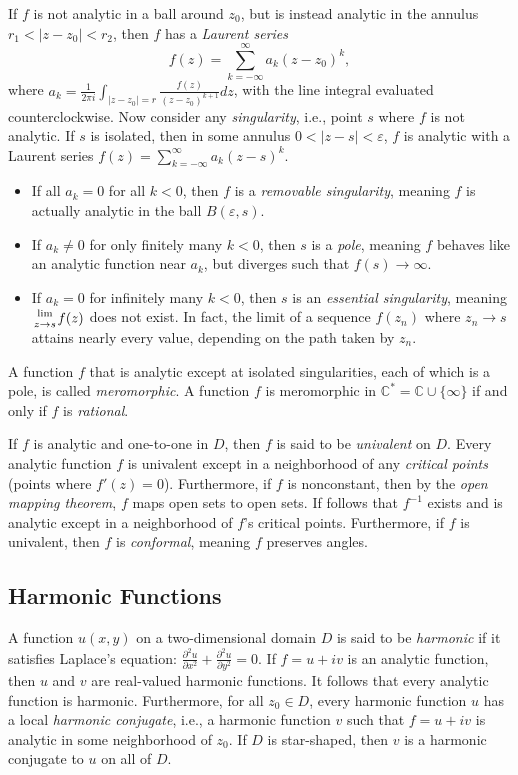 \documentclass[12pt]{article}
\begin{document}
If $f$ is not analytic in a ball around $z_0$, but is instead analytic
in the annulus $r_1 < |z - z_0| < r_2$, then $f$ has a {\it Laurent series}
$$f(z)=\sum_{k=-\infty}^{\infty} a_k (z-z_0)^k,$$
where $a_k = \frac{1}{2\pi i}\int_{|z-z_0|=r}\frac{f(z)}{(z-z_0)^{k+1}} dz$,
with the line integral evaluated counterclockwise.
Now consider any {\it singularity}, i.e., point $s$ where $f$ is not
analytic. If $s$ is isolated, then in some annulus $0<|z-s|<\varepsilon$,
$f$ is analytic with a Laurent series 
$f(z)=\sum_{k=-\infty}^\infty a_k(z-s)^k$.
\begin{itemize}
	\item If all $a_k = 0$ for all $k < 0$, then $f$ is a
		{\it removable singularity}, meaning $f$ is actually
		analytic in the ball $B(\varepsilon,s)$.
	\item If $a_k \neq 0$ for only finitely many $k < 0$, then $s$
		is a {\it pole}, meaning $f$ behaves like an analytic
		function near $a_k$, but diverges such that
		$f(s)\rightarrow\infty$.
	\item If $a_k = 0$ for infinitely many $k < 0$, then $s$ is an
		{\it essential singularity}, meaning
		${\lim \atop z\rightarrow s}f(z)$ does not exist. In fact,
		the limit of a sequence $f(z_n)$ where $z_n\rightarrow s$
		attains nearly every value, depending on the path
		taken by $z_n$.
\end{itemize}
A function $f$ that is analytic except at isolated singularities, each of
which is a pole, is called {\it meromorphic}. A function $f$ is
meromorphic in $\mathbb{C}^* = \mathbb{C}\cup\{\infty\}$ if and only if
$f$ is {\it rational}.

If $f$ is analytic and one-to-one in $D$, then $f$ is said to be
{\it univalent} on $D$. Every analytic function $f$ is univalent except
in a neighborhood of any {\it critical points}
(points where $f'(z) = 0$). Furthermore, if $f$ is nonconstant,
then by the {\it open mapping theorem}, $f$ maps open sets to open
sets. If follows that $f^{-1}$ exists and is analytic except in a
neighborhood of $f$'s critical points. Furthermore, if $f$ is
univalent, then $f$ is {\it conformal}, meaning $f$ preserves angles.

\subsection*{Harmonic Functions}

A function $u(x,y)$ on a two-dimensional domain $D$ is said to be
{\it harmonic} if it satisfies Laplace's equation:
$\frac{\partial^2 u}{\partial x^2} + \frac{\partial^2 u}{\partial y^2} = 0$.
If $f = u + iv$ is an analytic function, then $u$ and $v$ are real-valued
harmonic functions. It follows that every analytic function is harmonic.
Furthermore, for all $z_0\in D$, every harmonic function $u$ has a local
{\it harmonic conjugate}, i.e., a harmonic function $v$ such that
$f = u + iv$ is analytic in some neighborhood of $z_0$. If $D$ is
star-shaped, then $v$ is a harmonic conjugate to $u$ on all of $D$.
\end{document}
